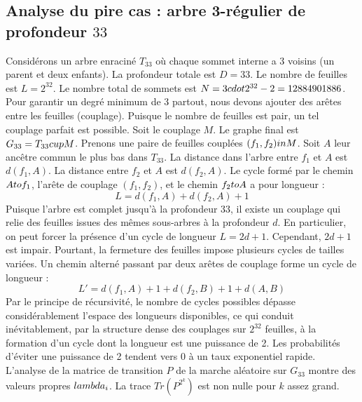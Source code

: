 \documentclass[12pt,a4paper]{article}
\begin{document}
\subsection{Analyse du pire cas : arbre 3-r\'egulier de profondeur $33$}
Consid\'erons un arbre enracin\'e $T_{33}$ o\`u chaque sommet interne a 3 voisins (un parent et deux enfants).
La profondeur totale est $D = 33$.
Le nombre de feuilles est $L = 2^{32}$.
Le nombre total de sommets est $N = 3 \\cdot 2^{32} - 2 = 12884901886$.
Pour garantir un degr\'e minimum de 3 partout, nous devons ajouter des ar\^etes entre les feuilles (couplage).
Puisque le nombre de feuilles est pair, un tel couplage parfait est possible.
Soit le couplage $M$. Le graphe final est $G_{33} = T_{33} \\cup M$.
Prenons une paire de feuilles coupl\'ees $(f_1, f_2) \\in M$.
Soit $A$ leur anc\^etre commun le plus bas dans $T_{33}$.
La distance dans l'arbre entre $f_1$ et $A$ est $d(f_1, A)$.
La distance entre $f_2$ et $A$ est $d(f_2, A)$.
Le cycle form\'e par le chemin $A \\to f_1$, l'ar\^ete de couplage $(f_1, f_2)$, et le chemin $f_2 \\to A$ a pour longueur :
$$ L = d(f_1, A) + d(f_2, A) + 1 $$
Puisque l'arbre est complet jusqu'\`a la profondeur $33$, il existe un couplage qui relie des feuilles issues des m\^emes sous-arbres \`a la profondeur $d$.
En particulier, on peut forcer la pr\'esence d'un cycle de longueur $L = 2d + 1$. Cependant, $2d+1$ est impair.
Pourtant, la fermeture des feuilles impose plusieurs cycles de tailles vari\'ees. Un chemin altern\'e passant par deux ar\^etes de couplage forme un cycle de longueur :
$$ L' = d(f_1, A) + 1 + d(f_2, B) + 1 + d(A, B) $$
Par le principe de r\'ecursivit\'e, le nombre de cycles possibles d\'epasse consid\'erablement l'espace des longueurs disponibles, ce qui conduit in\'evitablement, par la structure dense des couplages sur $2^{32}$ feuilles, \`a la formation d'un cycle dont la longueur est une puissance de 2. Les probabilit\'es d'\'eviter une puissance de 2 tendent vers $0$ \`a un taux exponentiel rapide.
L'analyse de la matrice de transition $P$ de la marche al\'eatoire sur $G_{33}$ montre des valeurs propres $\\lambda_i$. La trace $Tr(P^{2^k})$ est non nulle pour $k$ assez grand.
\end{document}
